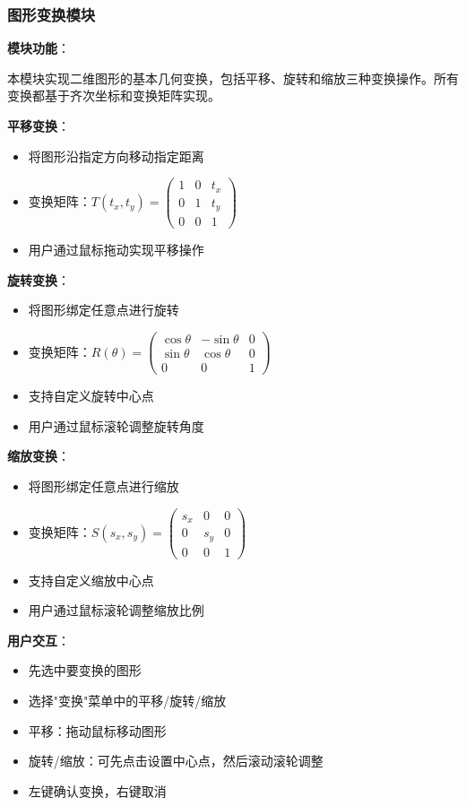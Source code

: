 \documentclass[12pt,a4paper]{article}
\begin{document}
\begin{tcolorbox}
\subsubsection{图形变换模块}

\textbf{模块功能}：

本模块实现二维图形的基本几何变换，包括平移、旋转和缩放三种变换操作。所有变换都基于齐次坐标和变换矩阵实现。

\textbf{平移变换}：
\begin{itemize}
    \item 将图形沿指定方向移动指定距离
    \item 变换矩阵：$T(t_x, t_y) = \begin{pmatrix} 1 & 0 & t_x \\ 0 & 1 & t_y \\ 0 & 0 & 1 \end{pmatrix}$
    \item 用户通过鼠标拖动实现平移操作
\end{itemize}

\textbf{旋转变换}：
\begin{itemize}
    \item 将图形绑定任意点进行旋转
    \item 变换矩阵：$R(\theta) = \begin{pmatrix} \cos\theta & -\sin\theta & 0 \\ \sin\theta & \cos\theta & 0 \\ 0 & 0 & 1 \end{pmatrix}$
    \item 支持自定义旋转中心点
    \item 用户通过鼠标滚轮调整旋转角度
\end{itemize}

\textbf{缩放变换}：
\begin{itemize}
    \item 将图形绑定任意点进行缩放
    \item 变换矩阵：$S(s_x, s_y) = \begin{pmatrix} s_x & 0 & 0 \\ 0 & s_y & 0 \\ 0 & 0 & 1 \end{pmatrix}$
    \item 支持自定义缩放中心点
    \item 用户通过鼠标滚轮调整缩放比例
\end{itemize}

\textbf{用户交互}：
\begin{itemize}
    \item 先选中要变换的图形
    \item 选择"变换"菜单中的平移/旋转/缩放
    \item 平移：拖动鼠标移动图形
    \item 旋转/缩放：可先点击设置中心点，然后滚动滚轮调整
    \item 左键确认变换，右键取消
\end{itemize}
\end{tcolorbox}
\end{document}
